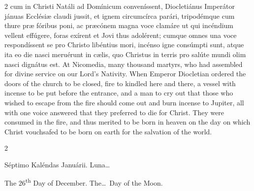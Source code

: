 \begin{paracol}{2}
 cum in Christi Natáli ad Domínicum conveníssent, Diocletiánus Imperátor 
 jánuas Ecclésiæ claudi jussit, et ignem circumcírca parári, tripodémque cum 
 thure præ fóribus poni, ac præcónem magna voce clamáre ut qui incéndium 
 vellent effúgere, foras exírent et Jovi thus adolérent; cumque omnes una 
 voce respondíssent se pro Christo libéntius mori, incénso igne consúmpti 
 sunt, atque ita eo die nasci meruérunt in cælis, quo Christus in terris pro 
 salúte mundi olim nasci dignátus est.
\switchcolumn
{}
At Nicomedia, many thousand martyrs, who had assembled for divine service on 
 our Lord's Nativity. When Emperor Diocletian ordered the doors of the 
 church to be closed, fire to kindled here and there, a vessel with incense 
 to be put before the entrance, and a man to cry out that those who wished to 
 escape from the fire should come out and burn incense to Jupiter, all with 
 one voice answered that they preferred to die for Christ. They were 
 consumed in the fire, and thus merited to be born in heaven on the day on 
 which Christ vouchsafed to be born on earth for the salvation of the world.
\switchcolumn*
{}
\end{paracol}


\begin{paracol}{2}
\begin{center}{\color{gregoriocolor} Séptimo Kaléndas Januárii. 
 Luna\dots\ }\end{center}
\switchcolumn
{}
\begin{center}{\color{gregoriocolor} The 
 26\textsuperscript{th} Day of 
 December. The\dots\ Day of the Moon.}\end{center}
\end{paracol}

